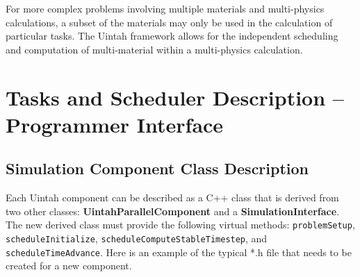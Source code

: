 \documentclass[12pt]{report}
\begin{document}
For more complex problems involving multiple materials and
multi-physics calculations, a subset of the materials may only be used
in the calculation of particular tasks.  The Uintah framework allows
for the independent scheduling and computation of multi-material
within a multi-physics calculation.

\section{Tasks and Scheduler Description -- Programmer Interface}

\subsection{Simulation Component Class Description}

Each Uintah component can be described as a C++ class that is derived
from two other classes: \textbf{UintahParallelComponent} and a
\textbf{SimulationInterface}. The new derived class must provide the
following virtual methods: \texttt{problemSetup},
\texttt{scheduleInitialize}, \texttt{scheduleComputeStableTimestep},
and \texttt{scheduleTimeAdvance}.  Here is an example of the typical
*.h file that needs to be created for a new component.
\end{document}
